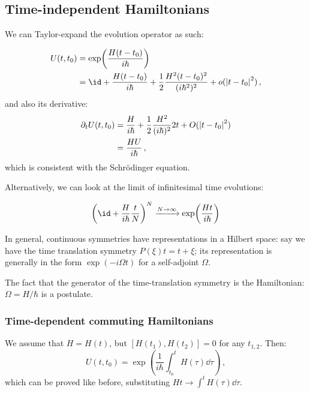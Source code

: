 \documentclass[main.tex]{subfiles}
\begin{document}
\subsection{Time-independent Hamiltonians}

We can Taylor-expand the evolution operator as such:

\begin{subequations}
\begin{align}
  U(t, t_0) &= \exp(\frac{H (t-t_0)}{i \hbar} )  \\
  &= \id + \frac{H (t-t_0)}{i \hbar} + \frac{1}{2} \frac{H^2 (t-t_0)^2}{(i \hbar^2)^2} + o(\abs{t-t_0}^2 )\,,
\end{align}
\end{subequations}
%
and also its derivative:
%
\begin{subequations}
\begin{align}
  \partial_t U(t, t_0) &= \frac{H}{i \hbar} + \frac{1}{2} \frac{H^2}{(i \hbar)^2} 2t + O(\abs{t-t_0}^2)   \\
  &= \frac{HU}{i \hbar} \,,
\end{align}
\end{subequations}
%
which is consistent with the Schrödinger equation.

Alternatively, we can look at the limit of infinitesimal time evolutions:

\begin{equation}
  \qty(\id + \frac{H}{i \hbar} \frac{t}{N})^N \xrightarrow{N\rightarrow\infty}
 \exp( \frac{Ht}{i \hbar} )
\end{equation}

In general, continuous symmetries have representations in a Hilbert space: say we have the time translation symmetry \(P(\xi) t = t + \xi\); its representation is generally in the form \(\exp(-i \Omega t) \) for a self-adjoint \(\Omega\).

The fact that the generator of the time-translation symmetry is the Hamiltonian: \(\Omega = H / \hbar\) is a postulate.

\subsubsection{Time-dependent commuting Hamiltonians}

We assume that \(H = H(t)\), but \([H(t_1), H(t_2)] = 0\) for any \(t_{1, 2}\).
Then:
%
\begin{equation}
  U(t, t_0) = \exp(\frac{1}{i \hbar} \int_{t_0}^t  H(\tau) \dd{\tau}) \,,
\end{equation}
%
which can be proved like before, substituting \(Ht \rightarrow \int^t H(\tau) \dd{\tau}\).
\end{document}

